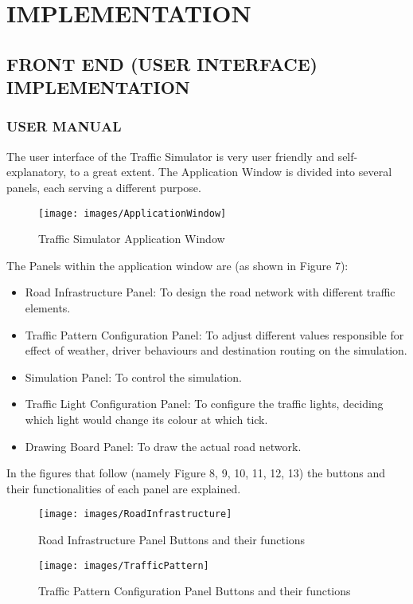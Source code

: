 \documentclass[11pt,a4paper]{article}
\begin{document}
\section{IMPLEMENTATION}
  \subsection{FRONT END (USER INTERFACE) IMPLEMENTATION}
	\subsubsection{USER MANUAL}
	The user interface of the Traffic Simulator is very user friendly
	and self-explanatory, to a great extent. The Application Window is divided into several panels, each serving
	a different purpose.
		\begin{figure}[h]
			\texttt{[image: images/ApplicationWindow]}
			\caption{Traffic Simulator Application Window}
			\centering
		\end{figure}
	The Panels within the application window are (as shown in Figure 7):
	\begin{itemize}
	\setlength\itemsep{0.3em}
		\item Road Infrastructure Panel: To design the road network with different traffic elements.
		\item Traffic Pattern Configuration Panel: To adjust different values responsible for effect of weather, driver behaviours and destination routing on the simulation.
		\item Simulation Panel: To control the simulation.
		\item Traffic Light Configuration Panel: To configure the traffic lights, deciding which light would change its colour at which tick.
		\item Drawing Board Panel: To draw the actual road network.
	\end{itemize}
	In the figures that follow (namely Figure 8, 9, 10, 11, 12, 13) the buttons and their functionalities of each panel are explained.
	
	\begin{figure}[bp!]
		\texttt{[image: images/RoadInfrastructure]}
		\caption{Road Infrastructure Panel Buttons and their functions}
		\centering
	\end{figure}
	
	\begin{figure}[bp!]
		\texttt{[image: images/TrafficPattern]}
		\caption{Traffic Pattern Configuration Panel Buttons and their functions}
		\centering
	\end{figure}
	
\end{document}
